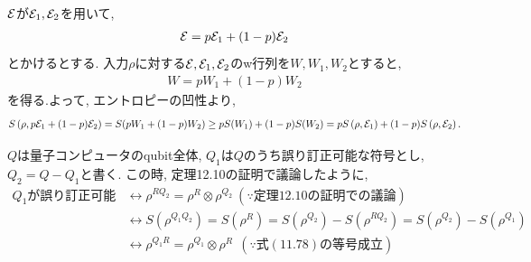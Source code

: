 \begin{ex}
    \label{ex12.12}
\end{ex}

\begin{ex}
    \label{ex12.13}
    $\mathcal{E}$が$\mathcal{E}_1, \mathcal{E}_2$を用いて,
    \begin{align*}
        \mathcal{E} = p \mathcal{E}_1 + ( 1 - p) \mathcal{E}_2
    \end{align*}
    とかけるとする. 入力$\rho$に対する$\mathcal{E}, \mathcal{E}_1, \mathcal{E}_2$のw行列を$W, W_1, W_2$とすると,
    \begin{align*}
        W = p W_1 + (1-p) W_2
    \end{align*}
    を得る.よって, エントロピーの凹性より,
    \begin{align*}
        S \left( \rho, p \mathcal{E}_1 + (1-p)\mathcal{E}_2 \right)
        =
        S(pW_1 + (1-p)W_2 )
        \ge
        p S(W_1) + (1-p) S(W_2)
        =
        p S \left( \rho, \mathcal{E}_1\right) + (1-p) S \left( \rho, \mathcal{E}_2\right).
    \end{align*}
\end{ex}

\begin{ex}
    \label{ex12.14}
    $Q$は量子コンピュータのqubit全体, $Q_1$は$Q$のうち誤り訂正可能な符号とし, $Q_2 = Q - Q_1$と書く. この時, 定理12.10の証明で議論したように, 
    \begin{align*}
        Q_1 が誤り訂正可能 
        &\longleftrightarrow
        \rho^{R Q_2} = \rho^{R} \otimes \rho^{Q_2}  \ (\because 定理12.10の証明での議論)\\
        &\longleftrightarrow
        S\left( \rho^{Q_1 Q_2}\right)
        =
        S\left( \rho^R\right)
        =
        S\left( \rho^{Q_2}\right) -  S\left( \rho^{RQ_2}\right) = S\left( \rho^{Q_2}\right) -  S\left( \rho^{Q_1}\right)\\
        &\longleftrightarrow
        \rho^{Q_1 R} = \rho^{Q_1} \otimes \rho^R \ \ (\because 式(11.78)の等号成立)
    \end{align*}
\end{ex}

